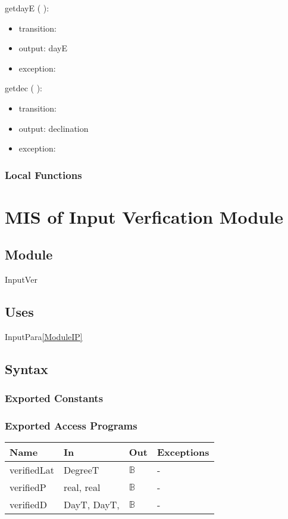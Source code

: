 \documentclass[12pt, titlepage]{article}
\begin{document}
\noindent  getdayE ( ):
\begin{itemize}
\item transition: 
\item output: dayE
\item exception: 
\end{itemize}

\noindent  getdec ( ):
\begin{itemize}
\item transition: 
\item output: declination
\item exception: 
\end{itemize}

\subsubsection{Local Functions}

\section{MIS of Input Verfication Module} \label{ModuleIV} 

\subsection{Module}
InputVer

\subsection{Uses}
InputPara\ref{ModuleIP}

\subsection{Syntax}

\subsubsection{Exported Constants}


\subsubsection{Exported Access Programs}

\begin{center}
\begin{tabular}{p{2cm} p{5cm} p{2cm} p{5cm}}
\hline
\textbf{Name} & \textbf{In} & \textbf{Out} & \textbf{Exceptions} \\
\hline 
verifiedLat & DegreeT& $\mathbb{B}$ & - \\
verifiedP &  real, real & $\mathbb{B}$ & - \\
verifiedD & DayT, DayT, & $\mathbb{B}$ & - \\
\hline
\end{tabular}
\end{center}
\end{document}
